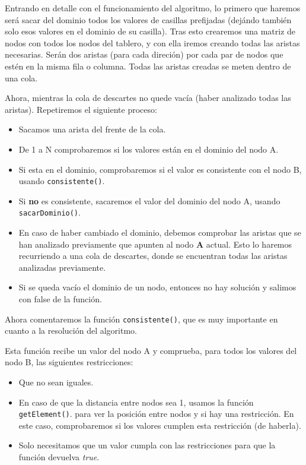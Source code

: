 \documentclass[12pt]{article}
\begin{document}
Entrando en detalle con el funcionamiento del algoritmo, lo primero que haremos será sacar del dominio todos los valores de casillas
prefijadas (dejándo también solo esos valores en el dominio de su casilla). Tras esto crearemos una matriz de nodos con todos los nodos
del tablero, y con ella iremos creando todas las aristas necesarias. Serán dos aristas (para cada direción) por cada par de nodos que 
estén en la misma fila o columna. Todas las aristas creadas se meten dentro de una cola.

Ahora, mientras la cola de descartes no quede vacía (haber analizado todas las aristas). Repetiremos el siguiente proceso:

\begin{itemize}
    \item Sacamos una arista del frente de la cola.
    \item De 1 a N comprobaremos si los valores están en el dominio del nodo A.
    \item Si esta en el dominio, comprobaremos si el valor es consistente con el nodo B, usando \verb|consistente()|.
    \item Si \textbf{no} es consistente, sacaremos el valor del dominio del nodo A, usando \verb|sacarDominio()|. 
    \item En caso de haber cambiado el dominio, debemos comprobar las aristas que se 
        han analizado previamente que apunten al nodo \textbf{A} actual. Esto lo haremos recurriendo 
        a una cola de descartes, donde se encuentran todas las aristas analizadas previamente.
    \item Si se queda vacío el dominio de un nodo, entonces no hay solución y salimos con false de la función.
\end{itemize}

Ahora comentaremos la función \verb|consistente()|, que es muy importante en cuanto a la resolución del algoritmo.

Esta función recibe un valor del nodo A y comprueba, para todos los valores del nodo B, las siguientes restricciones:

\begin{itemize}
\item Que no sean iguales.
\item En caso de que la distancia entre nodos sea 1, usamos la función \verb|getElement()|. 
    para ver la posición entre nodos y si hay una restricción. En este caso, comprobaremos si los valores cumplen esta restricción
    (de haberla).
\item Solo necesitamos que un valor cumpla con las restricciones para que la función devuelva \textit{true}.
\end{itemize}
\end{document}
